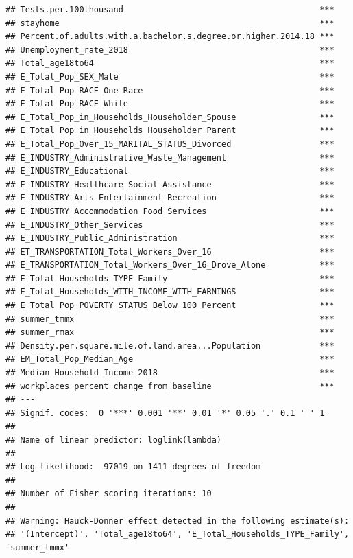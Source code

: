 \documentclass[
]{article}
\begin{document}
\begin{verbatim}
## Tests.per.100thousand                                        ***
## stayhome                                                     ***
## Percent.of.adults.with.a.bachelor.s.degree.or.higher.2014.18 ***
## Unemployment_rate_2018                                       ***
## Total_age18to64                                              ***
## E_Total_Pop_SEX_Male                                         ***
## E_Total_Pop_RACE_One_Race                                    ***
## E_Total_Pop_RACE_White                                       ***
## E_Total_Pop_in_Households_Householder_Spouse                 ***
## E_Total_Pop_in_Households_Householder_Parent                 ***
## E_Total_Pop_Over_15_MARITAL_STATUS_Divorced                  ***
## E_INDUSTRY_Administrative_Waste_Management                   ***
## E_INDUSTRY_Educational                                       ***
## E_INDUSTRY_Healthcare_Social_Assistance                      ***
## E_INDUSTRY_Arts_Entertainment_Recreation                     ***
## E_INDUSTRY_Accommodation_Food_Services                       ***
## E_INDUSTRY_Other_Services                                    ***
## E_INDUSTRY_Public_Administration                             ***
## ET_TRANSPORTATION_Total_Workers_Over_16                      ***
## E_TRANSPORTATION_Total_Workers_Over_16_Drove_Alone           ***
## E_Total_Households_TYPE_Family                               ***
## E_Total_Households_WITH_INCOME_WITH_EARNINGS                 ***
## E_Total_Pop_POVERTY_STATUS_Below_100_Percent                 ***
## summer_tmmx                                                  ***
## summer_rmax                                                  ***
## Density.per.square.mile.of.land.area...Population            ***
## EM_Total_Pop_Median_Age                                      ***
## Median_Household_Income_2018                                 ***
## workplaces_percent_change_from_baseline                      ***
## ---
## Signif. codes:  0 '***' 0.001 '**' 0.01 '*' 0.05 '.' 0.1 ' ' 1
## 
## Name of linear predictor: loglink(lambda) 
## 
## Log-likelihood: -97019 on 1411 degrees of freedom
## 
## Number of Fisher scoring iterations: 10 
## 
## Warning: Hauck-Donner effect detected in the following estimate(s):
## '(Intercept)', 'Total_age18to64', 'E_Total_Households_TYPE_Family', 'summer_tmmx'
\end{verbatim}
\end{document}
